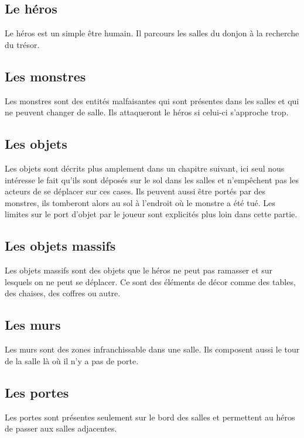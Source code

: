 \documentclass[a4paper, 11pt]{report}
\begin{document}
        \subsection{Le héros}
          Le héros est un simple \^etre humain. Il parcours les salles du donjon à la recherche du trésor.

        \subsection{Les monstres}
          Les monstres sont des entités malfaisantes qui sont présentes dans les salles et qui ne peuvent
          changer de salle. Ils attaqueront le héros si celui-ci s'approche trop.

        \subsection{Les objets}
          Les objets sont décrits plus amplement dans un chapitre suivant, ici seul nous intéresse le fait qu'ils
          sont déposés sur le sol dans les salles et n'emp\^echent pas les acteurs de se déplacer sur ces 
          cases. Ils peuvent aussi \^etre portés par des monstres, ils tomberont alors au sol à l'endroit où le
          monstre a été tué. Les limites sur le port d'objet par le joueur sont explicités plus loin dans cette 
          partie.
          
        \subsection{Les objets massifs}
          Les objets massifs sont des objets que le héros ne peut pas ramasser et sur lesquels on ne peut se
          déplacer. Ce sont des éléments de décor comme des tables, des chaises, des coffres ou autre.
          
        \subsection{Les murs}
          Les murs sont des zones infranchissable dans une salle. Ils composent aussi le tour de la salle là où
          il n'y a pas de porte.
          
        \subsection{Les portes}
          Les portes sont présentes seulement sur le bord des salles et permettent au héros de passer aux 
          salles adjacentes.
          
\end{document}
